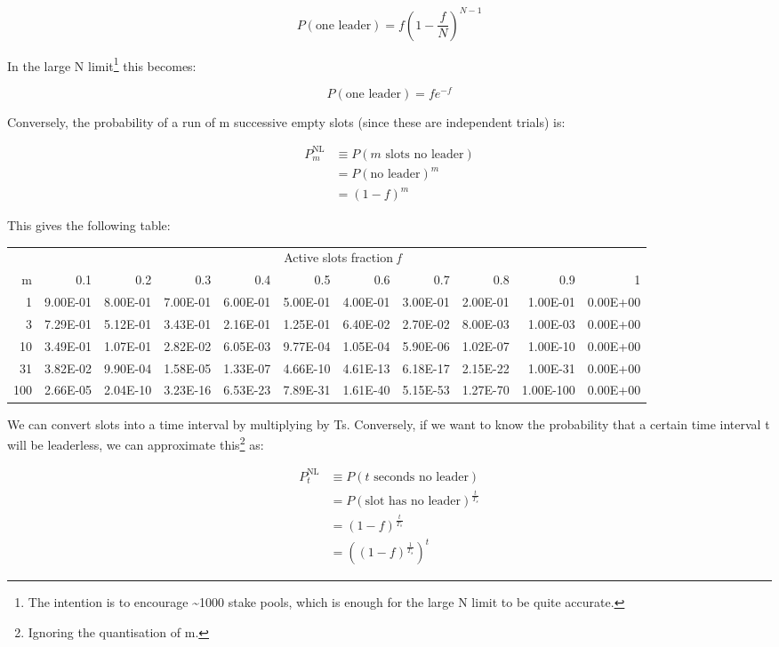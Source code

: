 \documentclass[11pt,a4paper]{article}
\begin{document}
\begin{equation*}
P( \text{one\ leader} ) = f \left( 1 - \frac{f}{N} \right)^{N - 1}
\end{equation*}

In the large N limit\footnote{The intention is to encourage
  \textasciitilde{}1000 stake pools, which is enough for the large N
  limit to be quite accurate.} this becomes:

\begin{equation*}
P( \text{one\ leader} ) = fe^{- f}
\end{equation*}

Conversely, the probability of a run of m successive empty slots (since
these are independent trials) is:

\begin{align*}
P_{m}^{\text{NL}} &\equiv P(m \text{ slots no leader}) \\
                  &= {P(\text{no leader})}^m \\
                  &= ( 1 - f )^{m}
\end{align*}

This gives the following table:

{\footnotesize
\begin{longtable}[]{r|rrrrrrrrrr}
\toprule
  & \multicolumn{10}{c}{Active slots fraction \emph{f}}\tabularnewline
m & 0.1 & 0.2 & 0.3 & 0.4 & 0.5 & 0.6 & 0.7 & 0.8 & 0.9 & 1\tabularnewline
\midrule
\endhead

1 & 9.00E-01 & 8.00E-01 & 7.00E-01 & 6.00E-01 & 5.00E-01 & 4.00E-01 &
3.00E-01 & 2.00E-01 & 1.00E-01 & 0.00E+00\tabularnewline
3 & 7.29E-01 & 5.12E-01 & 3.43E-01 & 2.16E-01 & 1.25E-01 & 6.40E-02 &
2.70E-02 & 8.00E-03 & 1.00E-03 & 0.00E+00\tabularnewline
10 & 3.49E-01 & 1.07E-01 & 2.82E-02 & 6.05E-03 & 9.77E-04 & 1.05E-04 &
5.90E-06 & 1.02E-07 & 1.00E-10 & 0.00E+00\tabularnewline
31 & 3.82E-02 & 9.90E-04 & 1.58E-05 & 1.33E-07 & 4.66E-10 & 4.61E-13 &
6.18E-17 & 2.15E-22 & 1.00E-31 & 0.00E+00\tabularnewline
100 & 2.66E-05 & 2.04E-10 & 3.23E-16 & 6.53E-23 & 7.89E-31 & 1.61E-40 &
5.15E-53 & 1.27E-70 & 1.00E-100 & 0.00E+00\tabularnewline
\bottomrule
\end{longtable}
}

We can convert slots into a time interval by multiplying by Ts.
Conversely, if we want to know the probability that a certain time
interval t will be leaderless, we can approximate this\footnote{Ignoring
  the quantisation of m.} as:

\begin{align*}
P_{t}^{\text{NL}} &\equiv P(t \text{ seconds no leader}) \\
                  &= {P(\text{slot has no leader})}^{\frac{t}{T_s}} \\
                  &= (1 - f)^{\frac{t}{T_s}} \\
                  &= \left( (1 - f)^{\frac{1}{T_s}} \right)^t
\end{align*}
\end{document}
